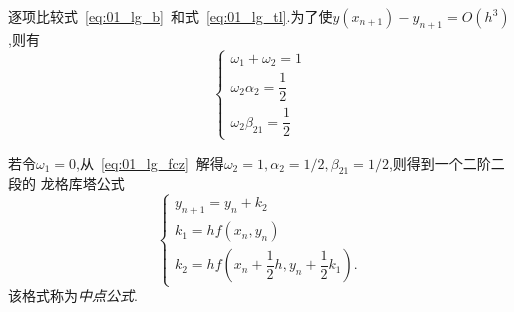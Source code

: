 逐项比较式~\eqref{eq:01_lg_b}~和式~\eqref{eq:01_lg_tl}.为了使$y(x_{n+1})-y_{n+1}=O(h^3)$,则有
\begin{equation}\label{eq:01_lg_fcz}
 \begin{cases}
  \omega_1+\omega_2 =1 \\[0.6em]
  \omega_2\alpha_2=\dfrac{1}{2} \\[0.6em]
  \omega_2\beta_{21}=\dfrac{1}{2} 
 \end{cases}
\end{equation}\par
若令$\omega_1=0$,从~\eqref{eq:01_lg_fcz}~解得$\omega_2=1,\alpha_2=1/2,\beta_{21}=1/2$,则得到一个二阶二段的
龙格库塔公式
\begin{equation}
 \begin{cases}
  y_{n+1} =y_n+k_2 \\
  k_1=hf(x_n,y_n) \\
  k_2=hf\left(x_n+\dfrac{1}{2}h,y_n+\dfrac{1}{2}k_1\right).
 \end{cases}
\end{equation}
该格式称为\emph{中点公式}.

